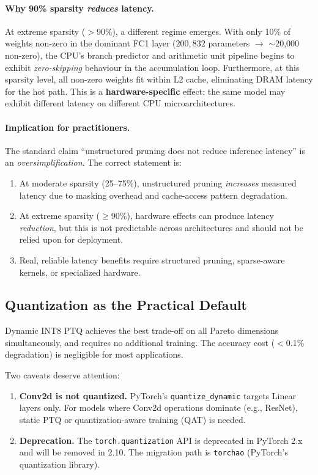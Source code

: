 \paragraph{Why 90\% sparsity \emph{reduces} latency.}
At extreme sparsity ($>$90\%), a different regime emerges.
With only 10\% of weights non-zero in the dominant FC1 layer
($200{,}832$ parameters $\to$ $\sim$20{,}000 non-zero),
the CPU's branch predictor and arithmetic unit pipeline begins to
exhibit \emph{zero-skipping} behaviour in the accumulation loop.
Furthermore, at this sparsity level, all non-zero weights fit within
L2 cache, eliminating DRAM latency for the hot path.
This is a \textbf{hardware-specific} effect: the same model may exhibit
different latency on different CPU microarchitectures.

\paragraph{Implication for practitioners.}
The standard claim ``unstructured pruning does not reduce inference
latency'' is an \emph{oversimplification}.
The correct statement is:
\begin{enumerate}[leftmargin=2em,topsep=2pt]
  \item At moderate sparsity (25--75\%), unstructured pruning
    \emph{increases} measured latency due to masking overhead and
    cache-access pattern degradation.
  \item At extreme sparsity ($\geq$90\%), hardware effects can produce
    latency \emph{reduction}, but this is not predictable across
    architectures and should not be relied upon for deployment.
  \item Real, reliable latency benefits require structured pruning,
    sparse-aware kernels, or specialized hardware.
\end{enumerate}


\subsection{Quantization as the Practical Default}

Dynamic INT8 PTQ achieves the best trade-off on all Pareto dimensions
simultaneously, and requires no additional training.
The accuracy cost ($<$0.1\% degradation) is negligible for most
applications.

Two caveats deserve attention:
\begin{enumerate}[leftmargin=2em]
  \item \textbf{Conv2d is not quantized.}
    PyTorch's \texttt{quantize\_dynamic} targets Linear layers only.
    For models where Conv2d operations dominate (e.g., ResNet),
    static PTQ or quantization-aware training (QAT) is needed.
  \item \textbf{Deprecation.}
    The \texttt{torch.quantization} API is deprecated in PyTorch 2.x
    and will be removed in 2.10.
    The migration path is \texttt{torchao} (PyTorch's quantization library).
\end{enumerate}

